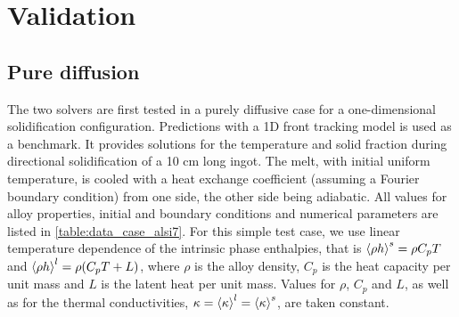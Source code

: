 \section{Validation}

\subsection{Pure diffusion}

The two solvers are first tested in a purely diffusive case for a one-dimensional solidification configuration. 
Predictions with a 1D front tracking model \citep{gandin_constrained_2000} is used as a benchmark. It provides 
solutions for the temperature and solid fraction during directional solidification of a 10 cm long 
ingot. The melt, with initial uniform temperature, is cooled with a heat exchange coefficient (assuming a Fourier 
boundary condition) from one side, the other side being adiabatic. All values for alloy properties, initial and 
boundary conditions and numerical parameters are listed in \cref{table:data_case_alsi7}. For this simple test case, 
we use linear temperature dependence of the intrinsic phase enthalpies, that is $\left \langle  \rho h  \right \rangle^s= \rho C_p T$ and $\left \langle  \rho h  \right \rangle^l= \rho (C_p T + L)$, 
where $\rho$ is the alloy density, $C_p$ is the heat capacity per unit mass and $L$ is the latent heat per unit mass. 
Values for $\rho$, $C_p$ and $L$, as well as for the thermal conductivities, $\kappa = \left \langle \kappa \right \rangle^l = \left \langle \kappa \right \rangle^s$, are taken constant. 

